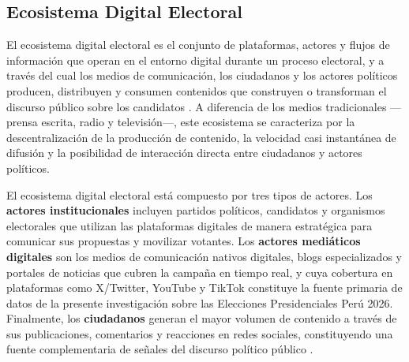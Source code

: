 
\subsection{Ecosistema Digital Electoral}

El ecosistema digital electoral es el conjunto de plataformas, actores y flujos de información que operan en el entorno digital durante un proceso electoral, y a través del cual los medios de comunicación, los ciudadanos y los actores políticos producen, distribuyen y consumen contenidos que construyen o transforman el discurso público sobre los candidatos \parencite{mc_chadwick2013hybrid}. A diferencia de los medios tradicionales —prensa escrita, radio y televisión—, este ecosistema se caracteriza por la descentralización de la producción de contenido, la velocidad casi instantánea de difusión y la posibilidad de interacción directa entre ciudadanos y actores políticos.

El ecosistema digital electoral está compuesto por tres tipos de actores. Los \textbf{actores institucionales} incluyen partidos políticos, candidatos y organismos electorales que utilizan las plataformas digitales de manera estratégica para comunicar sus propuestas y movilizar votantes. Los \textbf{actores mediáticos digitales} son los medios de comunicación nativos digitales, blogs especializados y portales de noticias que cubren la campaña en tiempo real, y cuya cobertura en plataformas como X/Twitter, YouTube y TikTok constituye la fuente primaria de datos de la presente investigación sobre las Elecciones Presidenciales Perú 2026. Finalmente, los \textbf{ciudadanos} generan el mayor volumen de contenido a través de sus publicaciones, comentarios y reacciones en redes sociales, constituyendo una fuente complementaria de señales del discurso político público \parencite{mc_ceron2017social}.

